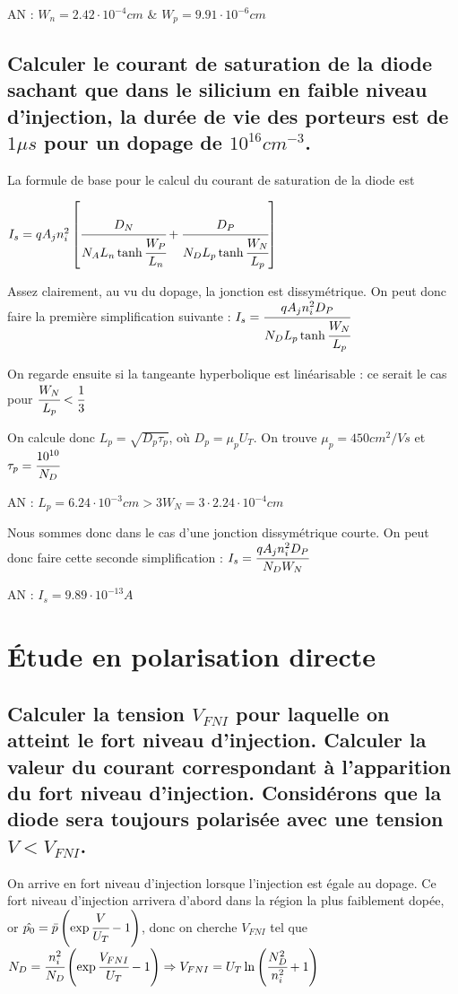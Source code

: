 \documentclass[10pt]{article}
\begin{document}
   AN : $W_n = 2.42\cdot 10^{-4}cm$ \& $W_p = 9.91\cdot 10^{-6}cm$

  \subsection{Calculer le courant de saturation de la diode sachant que dans le silicium en faible niveau d’injection, la durée de vie des porteurs est de $1\mu s$ pour un dopage de $10^{16} cm^{-3}$.}
   La formule de base pour le calcul du courant de saturation de la diode est 
   
   $I_s = q A_j n_i^2 \left[\cfrac{D_N}{N_A L_n \tanh\cfrac{W_P}{L_n}} + \cfrac{D_P}{N_D L_p \tanh\cfrac{W_N}{L_p}}\right]$

   Assez clairement, au vu du dopage, la jonction est dissymétrique. On peut donc faire la première simplification suivante : $I_s = \cfrac{q A_j n_i^2D_P}{N_D L_p \tanh\cfrac{W_N}{L_p}}$

   On regarde ensuite si la tangeante hyperbolique est linéarisable : ce serait le cas pour $\cfrac{W_N}{L_p} < \cfrac{1}{3}$

   On calcule donc $L_p = \sqrt{D_p \tau_p}$, où $D_p = \mu_p U_T$. On trouve $\mu_p = 450 cm^2/V s$ et $\tau_p = \cfrac{10^{10}}{N_D}$

   AN : $L_p = 6.24\cdot 10^{-3}cm > 3 W_N = 3\cdot 2.24\cdot 10^{-4}cm$

   Nous sommes donc dans le cas d'une jonction dissymétrique courte. On peut donc faire cette seconde simplification : $I_s = \cfrac{q A_j n_i^2 D_P}{N_D W_N}$

   AN : $I_s = 9.89\cdot 10^{-13} A$

 \section{Étude en polarisation directe}
  \subsection{Calculer la tension $V_{FNI}$ pour laquelle on atteint le fort niveau d’injection. Calculer la valeur du courant correspondant à l’apparition du fort niveau d’injection.  Considérons que la diode sera toujours polarisée avec une tension $V<V_{FNI}$.}
   On arrive en fort niveau d'injection lorsque l'injection est égale au dopage. Ce fort niveau d'injection arrivera d'abord dans la région la plus faiblement dopée, or $\hat{p_0} = \bar{p} \left( \exp\cfrac{V}{U_T} - 1\right)$, donc on cherche $V_{FNI}$ tel que $N_D = \cfrac{n_i^2}{N_D} \left( \exp\cfrac{V_{FNI}}{U_T} - 1\right) \Rightarrow V_{FNI} = U_T \ln{\left(\cfrac{N_D^2}{n_i^2} +1 \right)}$
\end{document}
